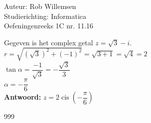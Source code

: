 \documentclass[a4paper]{article}
\begin{document}
\noindent \large Auteur: Rob Willemsen \\
\noindent \large Studierichting: Informatica\\
\noindent \large Oefeningenreeks 1C nr. 11.16\\

\medskip
\normalsize

Gegeven is het complex getal $z = \sqrt{3} - i$. \\

$r = \sqrt{(\sqrt{3})^2 + (-1)^2} = \sqrt{3 + 1} = \sqrt{4} = 2$ \\

$\tan \alpha = \dfrac{-1}{\sqrt{3}} = -\dfrac{\sqrt{3}}{3}$ \\

$\alpha = -\dfrac{\pi}{6}$ \\

\textbf{Antwoord:} $z = 2 \operatorname{cis} \left(-\dfrac{\pi}{6}\right)$ \\

\begin{thebibliography}{999}
\end{thebibliography}
\end{document}
